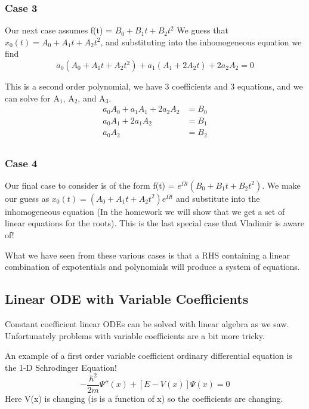 \documentclass{article}
\newcommand{\be}{\begin{equation}}
\newcommand{\ee}{\end{equation}}
\begin{document}
\subsubsection*{Case 3}
Our next case assumes f(t) = $B_0 + B_1t + B_2t^2$
We guess that $x_0(t) = A_0 + A_1t + A_2t^2$, and  substituting into the inhomogeneous equation we find
\be
a_0\left(A_0 + A_1t + A_2t^2\right) + a_1\left(A_1 + 2A_2t\right) + 2a_2A_2 = 0
\ee

This is a second order polynomial, we have 3 coefficients and 3 equations, and we can solve for A$_1$, A$_2$, and A$_3$.
\be
\begin{split}
    a_0A_0 + a_1A_1 + 2a_2A_2 &= B_0\\
    a_0A_1 + 2a_1A_2 &= B_1\\
    a_0A_2 &= B_2\\
\end{split}
\ee

\subsubsection*{Case 4}
Our final case to consider is of the form f(t) = $e^{\Omega t} \left( B_0 + B_1t + B_2t^2 \right)$.
We make our guess as $x_0(t) = \left(A_0 + A_1 t + A_2 t^2\right)e^{\Omega t}$ and substitute into the inhomogeneous equation (In the homework we will show that we get a set of linear equations for the roots).
This is the last special case that Vladimir is aware of!

What we have seen from these various cases is that a RHS containing a linear combination of expotentials and polynomials will produce a system of equations.

\subsection*{Linear ODE with Variable Coefficients}
Constant coefficient linear ODEs can be solved with linear algebra as we saw.
Unfortunately problems with variable coefficients are a bit more tricky.

An example of a first order variable coefficient ordinary differential equation is the 1-D Schrodinger Equation!
\be
-\frac{\hbar^2}{2m} \Psi''(x) + [E - V(x)] \Psi(x) = 0
\ee
Here V(x) is changing (is is a function of x) so the coefficients are changing.
\end{document}
